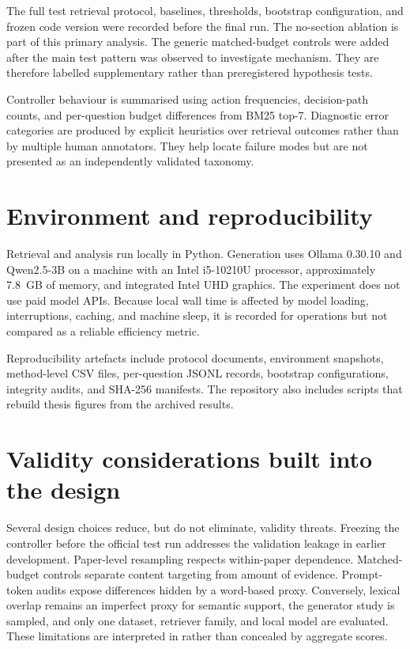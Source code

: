 The full test retrieval protocol, baselines, thresholds, bootstrap configuration, and frozen code version were recorded before the final run. The no-section ablation is part of this primary analysis. The generic matched-budget controls were added after the main test pattern was observed to investigate mechanism. They are therefore labelled supplementary rather than preregistered hypothesis tests.

Controller behaviour is summarised using action frequencies, decision-path counts, and per-question budget differences from BM25 top-7. Diagnostic error categories are produced by explicit heuristics over retrieval outcomes rather than by multiple human annotators. They help locate failure modes but are not presented as an independently validated taxonomy.

\section{Environment and reproducibility}

Retrieval and analysis run locally in Python. Generation uses Ollama 0.30.10 and Qwen2.5-3B on a machine with an Intel i5-10210U processor, approximately 7.8~GB of memory, and integrated Intel UHD graphics. The experiment does not use paid model APIs. Because local wall time is affected by model loading, interruptions, caching, and machine sleep, it is recorded for operations but not compared as a reliable efficiency metric.

Reproducibility artefacts include protocol documents, environment snapshots, method-level CSV files, per-question JSONL records, bootstrap configurations, integrity audits, and SHA-256 manifests. The repository also includes scripts that rebuild thesis figures from the archived results.

\section{Validity considerations built into the design}

Several design choices reduce, but do not eliminate, validity threats. Freezing the controller before the official test run addresses the validation leakage in earlier development. Paper-level resampling respects within-paper dependence. Matched-budget controls separate content targeting from amount of evidence. Prompt-token audits expose differences hidden by a word-based proxy. Conversely, lexical overlap remains an imperfect proxy for semantic support, the generator study is sampled, and only one dataset, retriever family, and local model are evaluated. These limitations are interpreted in  rather than concealed by aggregate scores.

